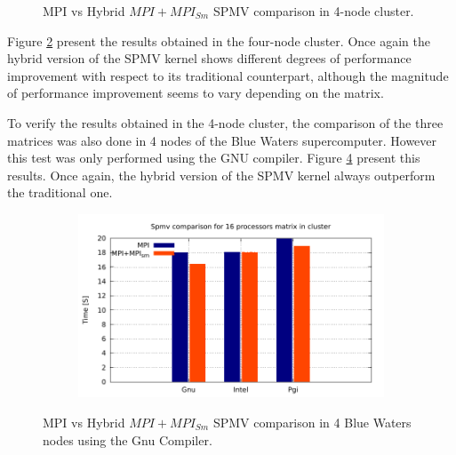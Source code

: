 \begin{figure} [h!]
\begin{subfigure}{.6\textwidth}
      \label{fig:HybridDunkel}
    \end{subfigure}
\caption{MPI vs Hybrid $MPI+MPI_{Sm}$ SPMV comparison in 4-node cluster.}
\label{fig:spmvCluster4}
\end{figure}


\medskip

Figure \ref{fig:spmvCluster4} present the results obtained in the four-node cluster. Once again the hybrid version of the SPMV kernel shows different degrees of performance improvement with respect to its traditional counterpart, although the magnitude of performance improvement seems to vary depending on the matrix.

\medskip

To verify the results obtained in the 4-node cluster, the comparison of the three matrices was also done in 4 nodes of the Blue Waters supercomputer. However this test was only performed using the GNU compiler. Figure \ref{fig:spmvClusteBW} present this results. Once again, the hybrid version of the SPMV kernel always outperform the traditional one.

\medskip


\begin{figure} [h!]
    \centering
    \captionsetup{justification=centering, singlelinecheck=false}
    \begin{subfigure}{.6\textwidth}
      \centering
      \hspace*{-1.5cm} 
      \includegraphics[page=4, width=0.95\linewidth]{Plots/HybridProgramming/spmvCluster.pdf}
      \label{fig:HybridPorter}
    \end{subfigure}%
\caption{MPI vs Hybrid $MPI+MPI_{Sm}$ SPMV comparison in 4 Blue Waters nodes using the Gnu Compiler.}
\label{fig:spmvClusteBW}
\end{figure}




